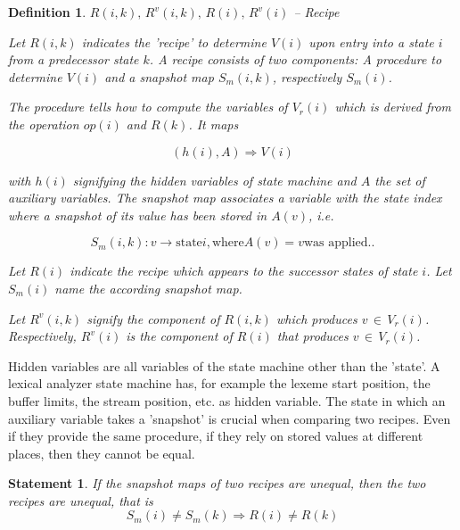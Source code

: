 \documentclass[12pt,a4paper]{scrartcl}
\newtheorem{definition}{Definition}
\newtheorem{statement}{Statement}
\begin{document}
\begin{definition}
    $R(i,k),\,R^v(i,k),\,R(i),\,R^v(i)$ -- Recipe 

Let $R(i,k)$ indicates the 'recipe' to determine $V(i)$ upon entry into a state
$i$ from a predecessor state $k$.  A recipe consists of two components: A
procedure to determine $V(i)$ and a snapshot map $S_m(i,k)$, respectively
$S_m(i)$.

The \textit{procedure} tells how to compute the variables of $V_r(i)$ which is derived
from the operation $op(i)$ and $R(k)$.  It maps

\begin{equation} \label{eq:recipe-procedure}
    (h(i), A) \Rightarrow V(i)                                             
\end{equation}

with $h(i)$ signifying the hidden variables of state machine and $A$ the set of
auxiliary variables.  The \textit{snapshot map} associates a variable with the state
index where a snapshot of its value has been stored in $A(v)$, i.e.

\begin{equation}
    \label{eq:snapshot-map}
    S_m(i,k):  v \rightarrow \mbox{state} i, \mbox{where} A(v) = v \mbox{was applied.}.
\end{equation}

Let $R(i)$ indicate the recipe which appears to the successor states of
state $i$. Let $S_m(i)$ name the according snapshot map.

Let $R^v(i,k)$ signify the component of $R(i,k)$ which produces
$v\,\in\,V_r(i)$.  Respectively, $R^v(i)$ is the component of $R(i)$ that
produces $v\,\in\,V_r(i)$.

\end{definition}

Hidden variables are all variables of the state machine other than the 'state'.
A lexical analyzer state machine has, for example the lexeme start position,
the buffer limits, the stream position, etc. as hidden variable. The state
in which an auxiliary variable takes a 'snapshot' is crucial when comparing
two recipes. Even if they provide the same procedure, if they rely on stored
values at different places, then they cannot be equal.

\begin{statement}
   If the snapshot maps of two recipes are unequal, then the two recipes
   are unequal, that is
   \begin{equation} \label{eq:snapshot-map-difference}
       S_m(i) \neq S_m(k) \Rightarrow R(i) \neq R(k)
   \end{equation}
\end{statement}
\end{document}
